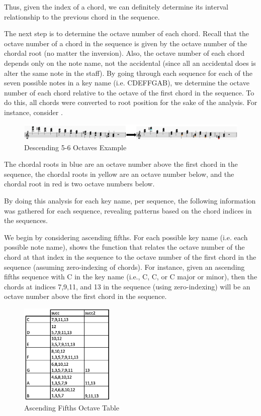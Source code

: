 \documentclass{report}
\begin{document}
Thus, given the index of a chord, we can definitely determine its interval relationship to the previous chord in the sequence.

The next step is to determine the octave number of each chord. Recall that the octave number of a chord in the sequence is given by the octave number of the chordal root (no matter the inversion). Also, the octave number of each chord depends only on the note name, not the accidental (since all an accidental does is alter the same note in the staff). By going through each sequence for each of the seven possible notes in a key name (i.e. CDEFFGAB), we determine the octave number of each chord relative to the octave of the first chord in the sequence. To do this, all chords were converted to root position for the sake of the analysis. For instance, consider . 

\begin{figure}[h!]
\centering
\includegraphics[width=1.1\textwidth]{images/desc56-example}
  \caption{Descending 5-6 Octaves Example}
  \label{fig:desc56-example}
\end{figure}

The chordal roots in blue are an octave number above the first chord in the sequence,  the chordal roots in yellow are an octave number below, and the chordal  root in red is two octave numbers below.

By doing this analysis for each key name, per sequence, the following information was gathered for each sequence, revealing patterns based on the chord indices in the sequences.

We begin by considering ascending fifths. For each possible key name (i.e. each possible note name),  shows the function that relates the octave number of the chord at that index in the sequence to the octave number of the first chord in the sequence (assuming zero-indexing of chords). For instance, given an ascending fifths sequence with C in the key name (i.e., C\musFlat, C\musNatural, or C\musSharp \; major or minor), then the chords at indices 7,9,11, and 13 in the sequence (using zero-indexing) will be an octave number above the first chord in the sequence.

\begin{figure}[h!]
\centering
\includegraphics[width=0.4\textwidth]{images/asc_fifths_octave_grid}
  \caption{Ascending Fifths Octave Table}
  \label{fig:asc_fifths_octave_grid}
\end{figure}
\end{document}

